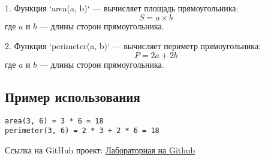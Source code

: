 \documentclass{article}
\begin{document}
1. Функция `area(a, b)` — вычисляет площадь прямоугольника:
   \[
   S = a \times b
   \]
   где \( a \) и \( b \) — длины сторон прямоугольника.

2. Функция `perimeter(a, b)` — вычисляет периметр прямоугольника:
   \[
   P = 2a + 2b
   \]
   где \( a \) и \( b \) — длины сторон прямоугольника.

\subsection{Пример использования}

\begin{verbatim}
area(3, 6) = 3 * 6 = 18
perimeter(3, 6) = 2 * 3 + 2 * 6 = 18
\end{verbatim}
Ссылка на GitHub проект: \href{https://github.com/Artem-Tev/Lab3-LaTeX}{Лабораторная на Github}
\end{document}
